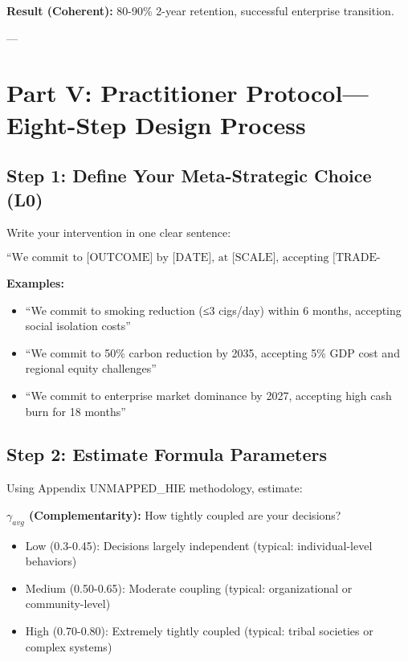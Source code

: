 \documentclass[11pt, a4paper]{article}
\begin{document}
\textbf{Result (Coherent):} 80-90\% 2-year retention, successful enterprise transition.

---

\section{Part V: Practitioner Protocol---Eight-Step Design Process} \label{sec:ch15-part5a}

\subsection{Step 1: Define Your Meta-Strategic Choice (L0)} \label{sec:ch15-part5b}

Write your intervention in one clear sentence:

$$\text{``We commit to [OUTCOME] by [DATE], at [SCALE], accepting [TRADE-OFFS]''}$$

\textbf{Examples:}
\begin{itemize}[nosep]
    \item ``We commit to smoking reduction (≤3 cigs/day) within 6 months, accepting social isolation costs''
    \item ``We commit to 50\% carbon reduction by 2035, accepting 5\% GDP cost and regional equity challenges''
    \item ``We commit to enterprise market dominance by 2027, accepting high cash burn for 18 months''
\end{itemize}

\subsection{Step 2: Estimate Formula Parameters} \label{sec:ch15-part5c}

Using Appendix UNMAPPED_HIE methodology, estimate:

\textbf{$\gamma_{avg}$ (Complementarity):} How tightly coupled are your decisions?
\begin{itemize}[nosep]
    \item Low (0.3-0.45): Decisions largely independent (typical: individual-level behaviors)
    \item Medium (0.50-0.65): Moderate coupling (typical: organizational or community-level)
    \item High (0.70-0.80): Extremely tightly coupled (typical: tribal societies or complex systems)
\end{itemize}
\end{document}
